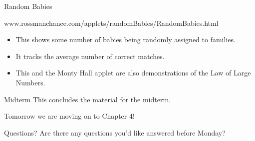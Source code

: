 \begin{frame}{Random Babies}
    \begin{center}
        www.rossmanchance.com/applets/randomBabies/RandomBabies.html
    \end{center}
    \vspace{12pt}\begin{itemize}
        \item This shows some number of babies being randomly assigned to families.
        \item It tracks the average number of correct matches.
        \item This and the Monty Hall applet are also demonstrations of the Law of Large Numbers.
    \end{itemize}
\end{frame}

\begin{frame}{Midterm}
    This concludes the material for the midterm.
    
    \vspace{12pt}Tomorrow we are moving on to Chapter 4!
\end{frame}

\begin{frame}{Questions?}
    Are there any questions you'd like answered before Monday?
\end{frame}